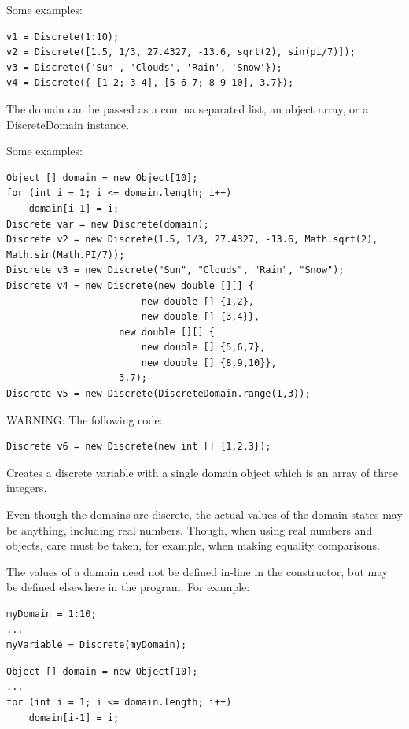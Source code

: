 Some examples:

\begin{lstlisting}
v1 = Discrete(1:10);
v2 = Discrete([1.5, 1/3, 27.4327, -13.6, sqrt(2), sin(pi/7)]);
v3 = Discrete({'Sun', 'Clouds', 'Rain', 'Snow'});
v4 = Discrete({ [1 2; 3 4], [5 6 7; 8 9 10], 3.7});
\end{lstlisting}

\fi


\ifjava

The domain can be passed as a comma separated list, an object array, or a DiscreteDomain instance.

Some examples:

\begin{lstlisting}
Object [] domain = new Object[10];
for (int i = 1; i <= domain.length; i++)
	domain[i-1] = i;
Discrete var = new Discrete(domain);
Discrete v2 = new Discrete(1.5, 1/3, 27.4327, -13.6, Math.sqrt(2), Math.sin(Math.PI/7));
Discrete v3 = new Discrete("Sun", "Clouds", "Rain", "Snow");
Discrete v4 = new Discrete(new double [][] {
						new double [] {1,2},
						new double [] {3,4}}, 
					new double [][] {
						new double [] {5,6,7},
						new double [] {8,9,10}},
					3.7);
Discrete v5 = new Discrete(DiscreteDomain.range(1,3));
\end{lstlisting}

WARNING:  The following code:

\begin{lstlisting}
Discrete v6 = new Discrete(new int [] {1,2,3});
\end{lstlisting}

Creates a discrete variable with a single domain object which is an array of three integers.

\fi

Even though the domains are discrete, the actual values of the domain states may be anything, including real numbers.  Though, when using real numbers and objects, care must be taken, for example, when making equality comparisons.

The values of a domain need not be defined in-line in the constructor, but may be defined elsewhere in the program.  For example:

\ifmatlab

\begin{lstlisting}
myDomain = 1:10;
...
myVariable = Discrete(myDomain);
\end{lstlisting}

\fi

\ifjava
\begin{lstlisting}
Object [] domain = new Object[10];
...
for (int i = 1; i <= domain.length; i++)
	domain[i-1] = i;
\end{lstlisting}
\fi

